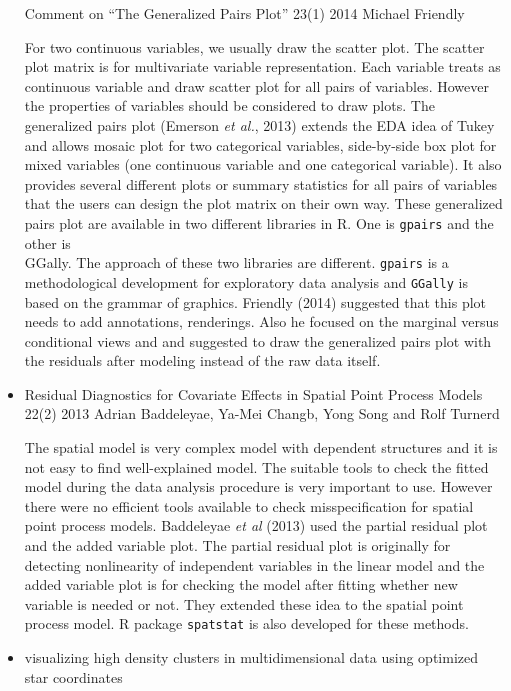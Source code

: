 \documentclass{article}
\begin{document}
\begin{itemize}
Comment on “The Generalized Pairs Plot” 23(1) 2014 Michael Friendly

For two continuous variables, we usually draw the scatter plot. The scatter plot matrix is for multivariate variable representation. Each variable treats as continuous variable and draw scatter plot for all pairs of variables. However
the properties of variables should be considered to draw plots. The generalized pairs plot (Emerson {\it et al.}, 2013) extends the EDA idea of Tukey and allows mosaic plot for two categorical variables, side-by-side box plot for mixed variables (one continuous variable and one categorical variable). It also provides several different plots or summary statistics for all pairs of variables that the users can design the plot matrix on their own way. These generalized pairs plot are available in two different libraries in R. One is {\tt gpairs} and the other is {\\ GGally}. The approach of these two libraries are different. {\tt gpairs} is a methodological development for exploratory data analysis and {\tt GGally} is based on the grammar of graphics. Friendly (2014) suggested that this plot needs to add annotations, renderings. Also he focused on the marginal versus conditional views and and suggested to draw the generalized pairs plot with the residuals after modeling instead of the raw data itself.

\item Residual Diagnostics for Covariate Effects in Spatial Point Process Models 22(2) 2013 Adrian Baddeleyae, Ya-Mei Changb, Yong Song and Rolf Turnerd

    The spatial model is very complex model with dependent structures and it is not easy to find well-explained model. The suitable tools to check the fitted model during the data analysis procedure is very important to use. However there were no efficient tools available to check misspecification for spatial point process models.  Baddeleyae {\it et al} (2013) used the partial residual plot and the added variable plot. The partial residual plot is originally for detecting nonlinearity of independent variables in the linear model and the added variable plot is for checking the model after fitting whether new variable is needed or not. They extended these idea to the spatial point process model.  R package {\tt spatstat} is also developed for these methods.


\item visualizing high density clusters in multidimensional data using optimized star coordinates


\end{itemize}
\end{document}
